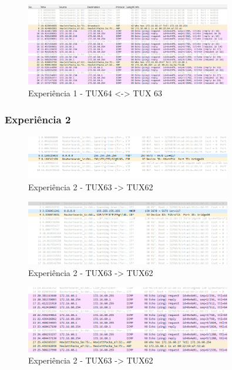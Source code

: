 \documentclass[11pt,a4paper]{article}
\begin{document}
\begin{figure}[H]
    \centering
    \includegraphics[width=0.8\textwidth]{images/part2-exp1.png}
    \caption{Experiência 1 - TUX64 <-> TUX 63}
\end{figure}

\subsubsection{Experiência 2}

\begin{figure}[H]
    \centering
    \includegraphics[width=0.8\textwidth]{images/exp2-ping3-2.png}
    \caption{Experiência 2 - TUX63 -> TUX62}
\end{figure}

\begin{figure}[H]
    \centering
    \includegraphics[width=0.8\textwidth]{images/exp2-ping3-2-broadcast.png}
    \caption{Experiência 2 - TUX63 -> TUX62}
\end{figure}

\begin{figure}[H]
    \centering
    \includegraphics[width=0.8\textwidth]{images/exp2-ping3-3-broadcast.png}
    \caption{Experiência 2 - TUX63 -> TUX62}
\end{figure}
\end{document}
